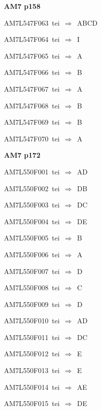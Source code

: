 \par\vfill\eject
{\bf\hfill AM7 p158\hfill\hbox{}}\par\bigskip
{\sixrm AM7L547F063\ {\sixit tei}\ }$\Rightarrow$\ ABCD\par\smallskip
{\sixrm AM7L547F064\ {\sixit tei}\ }$\Rightarrow$\ I\par\smallskip
{\sixrm AM7L547F065\ {\sixit tei}\ }$\Rightarrow$\ A\par\smallskip
{\sixrm AM7L547F066\ {\sixit tei}\ }$\Rightarrow$\ B\par\smallskip
{\sixrm AM7L547F067\ {\sixit tei}\ }$\Rightarrow$\ A\par\smallskip
{\sixrm AM7L547F068\ {\sixit tei}\ }$\Rightarrow$\ B\par\smallskip
{\sixrm AM7L547F069\ {\sixit tei}\ }$\Rightarrow$\ B\par\smallskip
{\sixrm AM7L547F070\ {\sixit tei}\ }$\Rightarrow$\ A\par\smallskip

\par\vfill\eject
{\bf\hfill AM7 p172\hfill\hbox{}}\par\bigskip
{\sixrm AM7L550F001\ {\sixit tei}\ }$\Rightarrow$\ AD\par\smallskip
{\sixrm AM7L550F002\ {\sixit tei}\ }$\Rightarrow$\ DB\par\smallskip
{\sixrm AM7L550F003\ {\sixit tei}\ }$\Rightarrow$\ DC\par\smallskip
{\sixrm AM7L550F004\ {\sixit tei}\ }$\Rightarrow$\ DE\par\smallskip
{\sixrm AM7L550F005\ {\sixit tei}\ }$\Rightarrow$\ B\par\smallskip
{\sixrm AM7L550F006\ {\sixit tei}\ }$\Rightarrow$\ A\par\smallskip
{\sixrm AM7L550F007\ {\sixit tei}\ }$\Rightarrow$\ D\par\smallskip
{\sixrm AM7L550F008\ {\sixit tei}\ }$\Rightarrow$\ C\par\smallskip
{\sixrm AM7L550F009\ {\sixit tei}\ }$\Rightarrow$\ D\par\smallskip
{\sixrm AM7L550F010\ {\sixit tei}\ }$\Rightarrow$\ AD\par\smallskip
{\sixrm AM7L550F011\ {\sixit tei}\ }$\Rightarrow$\ DC\par\smallskip
{\sixrm AM7L550F012\ {\sixit tei}\ }$\Rightarrow$\ E\par\smallskip
{\sixrm AM7L550F013\ {\sixit tei}\ }$\Rightarrow$\ E\par\smallskip
{\sixrm AM7L550F014\ {\sixit tei}\ }$\Rightarrow$\ AE\par\smallskip
{\sixrm AM7L550F015\ {\sixit tei}\ }$\Rightarrow$\ DE\par\smallskip

